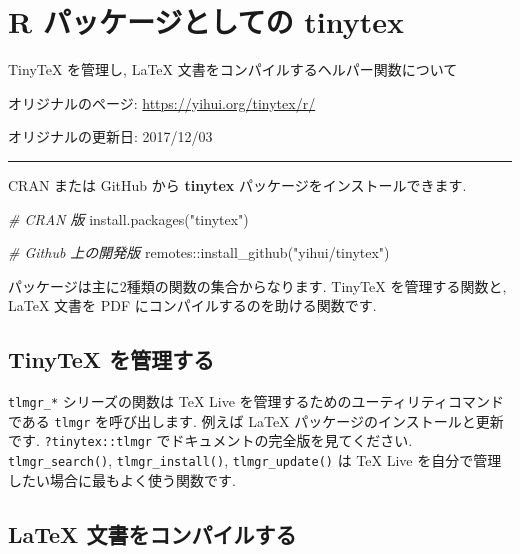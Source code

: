 \documentclass[
  xelatex,ja=standard,jafont=noto]{bxjsreport}
\newenvironment{Shaded}{\begin{snugshade}}{\end{snugshade}}
\newcommand{\CommentTok}[1]{\textcolor[rgb]{0.56,0.35,0.01}{\textit{#1}}}
\newcommand{\FunctionTok}[1]{\textcolor[rgb]{0.00,0.00,0.00}{#1}}
\newcommand{\NormalTok}[1]{#1}
\newcommand{\SpecialCharTok}[1]{\textcolor[rgb]{0.00,0.00,0.00}{#1}}
\newcommand{\StringTok}[1]{\textcolor[rgb]{0.31,0.60,0.02}{#1}}
\begin{document}
\hypertarget{r}{%
\chapter{\texorpdfstring{R パッケージとしての
\textbf{tinytex}}{R パッケージとしての tinytex}}\label{r}}

TinyTeX を管理し, LaTeX 文書をコンパイルするヘルパー関数について

オリジナルのページ: \url{https://yihui.org/tinytex/r/}

オリジナルの更新日: 2017/12/03

\begin{center}\rule{0.5\linewidth}{0.5pt}\end{center}

CRAN または GitHub から \textbf{tinytex}
パッケージをインストールできます.

\begin{Shaded}
\begin{Highlighting}[numbers=left,,]
\CommentTok{\# CRAN 版}
\FunctionTok{install.packages}\NormalTok{(}\StringTok{"tinytex"}\NormalTok{)}

\CommentTok{\# Github 上の開発版}
\NormalTok{remotes}\SpecialCharTok{::}\FunctionTok{install\_github}\NormalTok{(}\StringTok{"yihui/tinytex"}\NormalTok{)}
\end{Highlighting}
\end{Shaded}

パッケージは主に2種類の関数の集合からなります. TinyTeX を管理する関数と,
LaTeX 文書を PDF にコンパイルするのを助ける関数です.

\hypertarget{tinytex-ux3092ux7ba1ux7406ux3059ux308b}{%
\section{TinyTeX
を管理する}\label{tinytex-ux3092ux7ba1ux7406ux3059ux308b}}

\texttt{tlmgr\_*} シリーズの関数は TeX Live
を管理するためのユーティリティコマンドである \texttt{tlmgr}
を呼び出します. 例えば LaTeX パッケージのインストールと更新です.
\texttt{?tinytex::tlmgr} でドキュメントの完全版を見てください.
\texttt{tlmgr\_search()}, \texttt{tlmgr\_install()},
\texttt{tlmgr\_update()} は TeX Live
を自分で管理したい場合に最もよく使う関数です.

\hypertarget{latex-ux6587ux66f8ux3092ux30b3ux30f3ux30d1ux30a4ux30ebux3059ux308b}{%
\section{LaTeX
文書をコンパイルする}\label{latex-ux6587ux66f8ux3092ux30b3ux30f3ux30d1ux30a4ux30ebux3059ux308b}}
\end{document}
